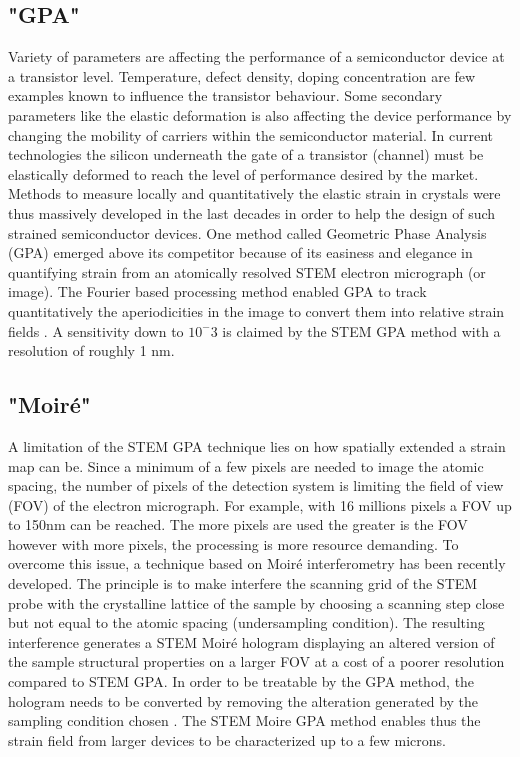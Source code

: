 \documentclass{article}
\begin{document}
\subsection{"GPA"}
Variety of parameters are affecting the performance of a semiconductor device at a transistor level. Temperature, defect density, doping concentration are few examples known to influence the transistor behaviour. Some secondary parameters like the elastic deformation is also affecting the device performance by changing the mobility of carriers within the semiconductor material. In current technologies the silicon underneath the gate of a transistor (channel) must be elastically deformed to reach the level of performance desired by the market. Methods to measure locally and quantitatively the elastic strain in crystals were thus massively developed in the last decades in order to help the design of such strained semiconductor devices. One method called Geometric Phase Analysis (GPA) emerged above its competitor because of its easiness and elegance in quantifying strain from an atomically resolved STEM electron micrograph (or image). The Fourier based processing method enabled GPA to track quantitatively the aperiodicities in the image to convert them into relative strain fields \cite{Hytch1998}. A sensitivity down to $10^-{3}$ is claimed by the STEM GPA method with a resolution of roughly 1 nm.
\subsection{"Moir{\'e}"}
A limitation of the STEM GPA technique lies on how spatially extended a strain map can be. Since a minimum of a few pixels are needed to image the atomic spacing, the number of pixels of the detection system is limiting the field of view (FOV) of the electron micrograph. For example, with 16 millions pixels a FOV up to 150nm can be reached. The more pixels are used the greater is the FOV however with more pixels, the processing is more resource demanding. To overcome this issue, a technique based on Moir{\'e} interferometry has been recently developed. The principle is to make interfere the scanning grid of the STEM probe with the crystalline lattice of the sample by choosing a scanning step close but not equal to the atomic spacing (undersampling condition). The resulting interference generates a STEM Moir{\'e }hologram displaying an altered version of the sample structural properties on a larger FOV at a cost of a poorer resolution compared to STEM GPA. In order to be treatable by the GPA method, the hologram needs to be converted by removing the alteration generated by the sampling condition chosen \cite{Pofelski2017}. The STEM Moire GPA method enables thus the strain field from larger devices to be characterized up to a few microns.
\end{document}
